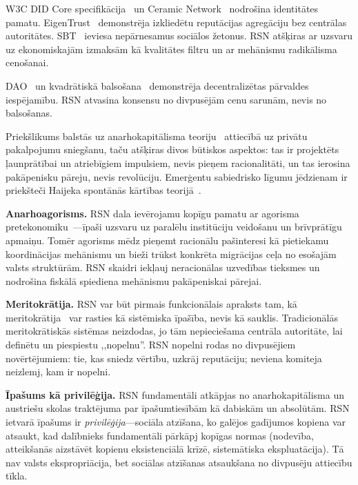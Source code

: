 \documentclass[11pt,a4paper,twocolumn]{article}
\begin{document}
W3C DID Core specifikācija~\cite{did2022} un Ceramic Network~\cite{ceramic2023} nodrošina identitātes pamatu. EigenTrust~\cite{kamvar2003} demonstrēja izkliedētu reputācijas agregāciju bez centrālas autoritātes. SBT~\cite{weyl2022} ieviesa nepārnesamus sociālos žetonus. RSN atšķiras ar uzsvaru uz ekonomiskajām izmaksām kā kvalitātes filtru un ar mehānismu radikālisma cenošanai.

DAO~\cite{buterin2014} un kvadrātiskā balsošana~\cite{buterin2019} demonstrēja decentralizētas pārvaldes iespējamību. RSN atvasina konsensu no divpusējām cenu sarunām, nevis no balsošanas.

Priekšlikums balstās uz anarhokapitālisma teoriju~\cite{rothbard1973,hoppe2001} attiecībā uz privātu pakalpojumu sniegšanu, taču atšķiras divos būtiskos aspektos: tas ir projektēts ļaunprātībai un atriebīgiem impulsiem, nevis pieņem racionalitāti, un tas ierosina pakāpenisku pāreju, nevis revolūciju. Emerģentu sabiedrisko līgumu jēdzienam ir priekšteči Haijeka spontānās kārtības teorijā~\cite{hayek1973}.

\textbf{Anarhoagorisms.} RSN dala ievērojamu kopīgu pamatu ar agorisma pretekonomiku~\cite{konkin2006}---īpaši uzsvaru uz paralēlu institūciju veidošanu un brīvprātīgu apmaiņu. Tomēr agorisms mēdz pieņemt racionālu paš\-interesi kā pietiekamu koordinācijas mehānismu un bieži trūkst konkrēta migrācijas ceļa no esošajām valsts struktūrām. RSN skaidri iekļauj neracionālas uzvedības tieksmes un nodrošina fiskālā spiediena mehānismu pakāpeniskai pārejai.

\textbf{Meritokrātija.} RSN var būt pirmais funkcionālais apraksts tam, kā meritokrātija~\cite{young1958} var rasties kā sistēmiska īpašība, nevis kā sauklis. Tradicionālās meritokrātiskās sistēmas neizdodas, jo tām nepieciešama centrāla autoritāte, lai definētu un piespiestu ,,nopelnu''. RSN nopelni rodas no divpusējiem novērtējumiem: tie, kas sniedz vērtību, uzkrāj reputāciju; neviena komiteja neizlemj, kam ir nopelni.

\textbf{Īpašums kā privilēģija.} RSN fundamentāli atkāpjas no anarhokapitālisma un austriešu skolas traktējuma par īpašumtiesībām kā dabiskām un absolūtām. RSN ietvarā īpašums ir \emph{privilēģija}---sociāla atzīšana, ko galējos gadījumos kopiena var atsaukt, kad dalībnieks fundamentāli pārkāpj kopīgas normas (nodevība, atteikšanās aizstāvēt kopienu eksistenciālā krīzē, sistemātiska ekspluatācija). Tā nav valsts ekspropriācija, bet sociālas atzīšanas atsaukšana no divpusēju attiecību tīkla.

\end{document}
